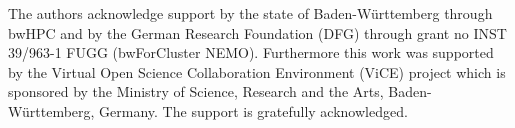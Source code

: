 
%
%


\begin{acknowledgements}
The authors acknowledge support by the state of Baden-W\"urttemberg through bwHPC
and by the German Research Foundation (DFG) through grant no INST 39/963-1 FUGG (bwForCluster NEMO).
Furthermore this work was supported by the Virtual Open Science Collaboration Environment (ViCE) project which is sponsored by the Ministry of Science, Research and the Arts, Baden-W\"urttemberg, Germany. The support is gratefully acknowledged.
\end{acknowledgements}

